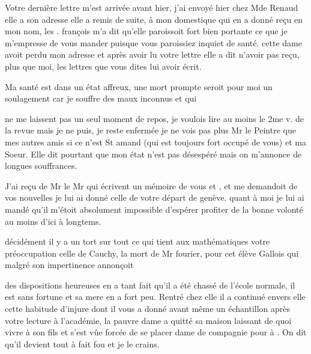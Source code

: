 \documentclass[11pt,a4paper]{article}
\begin{document}
Votre dernière lettre m'est arrivée avant hier, j'ai envoyé hier chez Mde
Renaud elle a son adresse elle a remis de suite, à mon domestique qui en a
donné reçu en mon nom, les . françois m'a dit qu'elle
paroissoit fort bien portante ce que je m'empresse de vous mander puisque
vous paroissiez inquiet de \struck{\ill{}} santé. cette dame avoit perdu mon
adresse et après avoir lu votre lettre elle a dit n'avoir pas reçu, plus que
moi, les lettres que vous dites lui avoir écrit.

Ma santé est dans un état affreux, une mort prompte seroit pour moi un
soulagement car je souffre des maux inconnus et qui

ne me laissent pas un seul moment de repos, je voulois lire au moins le 2me
v. de la revue mais je ne puis, je reste enfermée je ne vois pas plus Mr le
Peintre que mes autres amis si ce n'est St amand (qui est toujours fort
occupé de vous) et ma Soeur. Elle dit pourtant que mon état n'est pas
désespéré mais on m'annonce de longues souffrances.

J'ai reçu de Mr \ill{} le Mr qui écrivent un mémoire de vous et \ill{}, et me
demandoit de vos nouvelles je lui ai donné celle de votre départ de genève.
quant à moi je lui ai mandé qu'il m'étoit absolument impossible d'espérer
profiter de la bonne volonté au moins d'ici à longtems.


décidément il y a un tort sur tout ce qui tient aux mathématiques votre
préoccupation celle de Cauchy, la mort de Mr fourier, pour \ill{} cet élève
Gallois qui malgré son impertinence annonçoit


des dispositions heureuses en a tant fait qu'il a été chassé de l'école
normale, il est sans fortune et sa mere en a fort peu. Rentré chez elle il a
continué envers elle cette habitude d'injure dont il vous a donné avant même
un échantillon après votre lecture à l'académie, la pauvre dame a quitté sa
maison laissant de quoi vivre  à son fils et s'est
vûe forcée de se placer dame de compagnie pour  à
\ill{}. On dit qu'il devient tout à fait fou et je le crains.
\end{document}
